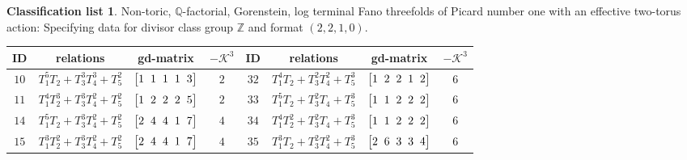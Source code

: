 \documentclass[pdftex]{sigma}%
\theoremstyle{definition}
\newtheorem{class-list}[thm]{Classification list}
\def\ZZ{{\mathbb Z}}
\def\QQ{{\mathbb Q}}
\numberwithin{equation}{section}
\begin{document}

\begin{class-list}\label{class-list(0)}
Non-toric, $\QQ$-factorial, Gorenstein, log terminal Fano
threefolds of Picard number one with an effective two-torus action:
Specifying data for divisor class group $\ZZ$ and format $(2,2,1,0)$.
\begin{table}[h!]\centering\setlength{\tabcolsep}{3.5pt}
\renewcommand{\arraystretch}{1.3}\small\tabulinesep=1mm
\begin{tabu}{c|c|c|c||c|c|c|c}
\hline
ID&relations&gd-matrix&$-\mathcal{K}^3$&ID&relations&gd-matrix&$-\mathcal{K}^3$
\\
\hline
$10$&$T_{1}^{5}T_{2}+T_{3}^{3}T_{4}^{3}+T_{5}^{2}$
&$\arraycolsep=1mm\begin{bmatrix}1&1&1&1&3\end{bmatrix}$&${2}$
&${32}$&${T_{1}^{4}T_{2}+T_{3}^{2}T_{4}^{2}+T_{5}^{3}}$
&$\arraycolsep=1mm\begin{bmatrix}{1} & {2} & {2} & {1} & {2}\end{bmatrix}$&${6}$
\\
\hline
${11}$&${T_{1}^{4}T_{2}^{3}+T_{3}^{3}T_{4}^{2}+T_{5}^{2}}$
&$\arraycolsep=1mm\begin{bmatrix}{1} & {2} & {2} & {2} & {5}\end{bmatrix}$&${2}$
&${33}$&${T_{1}^{5}T_{2}+T_{3}^{2}T_{4}+T_{5}^{3}}$
&$\arraycolsep=1mm\begin{bmatrix}{1} & {1} & {2} & {2} & {2}\end{bmatrix}$&${6}$
\\
\hline
${14}$&${T_{1}^{5}T_{2}+T_{3}^{3}T_{4}^{2}+T_{5}^{2}}$
&$\arraycolsep=1mm\begin{bmatrix}{2} & {4} & {4} & {1} & {7}\end{bmatrix}$&${4}$
&${34}$&${T_{1}^{4}T_{2}^{2}+T_{3}^{2}T_{4}+T_{5}^{3}}$
&$\arraycolsep=1mm\begin{bmatrix}{1} & {1} & {2} & {2} & {2}\end{bmatrix}$&${6}$
\\
\hline
${15}$&${T_{1}^{3}T_{2}^{2}+T_{3}^{3}T_{4}^{2}+T_{5}^{2}}$
&$\arraycolsep=1mm\begin{bmatrix}{2} & {4} & {4} & {1} & {7}\end{bmatrix}$&${4}$
&${35}$&${T_{1}^{3}T_{2}+T_{3}^{2}T_{4}^{2}+T_{5}^{3}}$
&$\arraycolsep=1mm\begin{bmatrix}{2} & {6} & {3} & {3} & {4}\end{bmatrix}$&${6}$
\\
\hline

\end{tabu}
\end{table}
\end{class-list}
\end{document}
